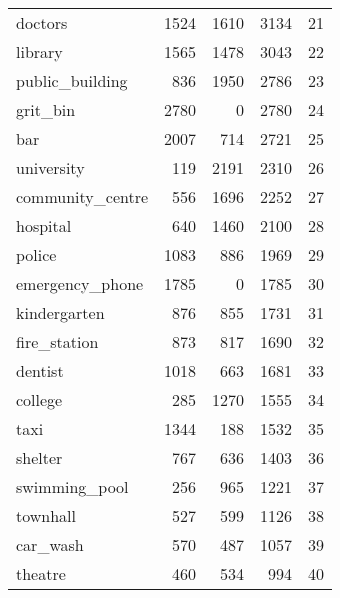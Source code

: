 \begin{tabular}{lrrrr}
doctors          &         1524 &           1610 &         3134 &    21 \\
library          &         1565 &           1478 &         3043 &    22 \\
public\_building  &          836 &           1950 &         2786 &    23 \\
grit\_bin         &         2780 &              0 &         2780 &    24 \\
bar              &         2007 &            714 &         2721 &    25 \\
university       &          119 &           2191 &         2310 &    26 \\
community\_centre &          556 &           1696 &         2252 &    27 \\
hospital         &          640 &           1460 &         2100 &    28 \\
police           &         1083 &            886 &         1969 &    29 \\
emergency\_phone  &         1785 &              0 &         1785 &    30 \\
kindergarten     &          876 &            855 &         1731 &    31 \\
fire\_station     &          873 &            817 &         1690 &    32 \\
dentist          &         1018 &            663 &         1681 &    33 \\
college          &          285 &           1270 &         1555 &    34 \\
taxi             &         1344 &            188 &         1532 &    35 \\
shelter          &          767 &            636 &         1403 &    36 \\
swimming\_pool    &          256 &            965 &         1221 &    37 \\
townhall         &          527 &            599 &         1126 &    38 \\
car\_wash         &          570 &            487 &         1057 &    39 \\
theatre          &          460 &            534 &          994 &    40 \\
\bottomrule
\end{tabular}
